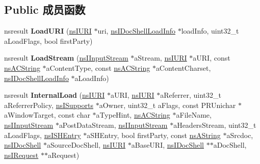 \subsection*{Public 成员函数}
\begin{DoxyCompactItemize}
\item 
\mbox{\label{interfacens_i_doc_shell_a72992d3fb915fd40d8b8e72e91249b92}} 
nsresult {\bfseries Load\+U\+RI} (\hyperlink{interfacens_i_u_r_i}{ns\+I\+U\+RI} $\ast$uri, \hyperlink{interfacens_i_doc_shell_load_info}{ns\+I\+Doc\+Shell\+Load\+Info} $\ast$load\+Info, uint32\+\_\+t a\+Load\+Flags, bool first\+Party)
\item 
\mbox{\label{interfacens_i_doc_shell_a13616578ed265801fd6cc0464797a67a}} 
nsresult {\bfseries Load\+Stream} (\hyperlink{interfacens_i_input_stream}{ns\+I\+Input\+Stream} $\ast$a\+Stream, \hyperlink{interfacens_i_u_r_i}{ns\+I\+U\+RI} $\ast$a\+U\+RI, const \hyperlink{structns_c_string_container}{ns\+A\+C\+String} $\ast$a\+Content\+Type, const \hyperlink{structns_c_string_container}{ns\+A\+C\+String} $\ast$a\+Content\+Charset, \hyperlink{interfacens_i_doc_shell_load_info}{ns\+I\+Doc\+Shell\+Load\+Info} $\ast$a\+Load\+Info)
\item 
\mbox{\label{interfacens_i_doc_shell_ab645058ca868a0bb4ae724ca9735cf42}} 
nsresult {\bfseries Internal\+Load} (\hyperlink{interfacens_i_u_r_i}{ns\+I\+U\+RI} $\ast$a\+U\+RI, \hyperlink{interfacens_i_u_r_i}{ns\+I\+U\+RI} $\ast$a\+Referrer, uint32\+\_\+t a\+Referrer\+Policy, \hyperlink{interfacens_i_supports}{ns\+I\+Supports} $\ast$a\+Owner, uint32\+\_\+t a\+Flags, const P\+R\+Unichar $\ast$a\+Window\+Target, const char $\ast$a\+Type\+Hint, \hyperlink{structns_c_string_container}{ns\+A\+C\+String} $\ast$a\+File\+Name, \hyperlink{interfacens_i_input_stream}{ns\+I\+Input\+Stream} $\ast$a\+Post\+Data\+Stream, \hyperlink{interfacens_i_input_stream}{ns\+I\+Input\+Stream} $\ast$a\+Headers\+Stream, uint32\+\_\+t a\+Load\+Flags, \hyperlink{interfacens_i_supports}{ns\+I\+S\+H\+Entry} $\ast$a\+S\+H\+Entry, bool first\+Party, const \hyperlink{structns_string_container}{ns\+A\+String} $\ast$a\+Srcdoc, \hyperlink{interfacens_i_doc_shell}{ns\+I\+Doc\+Shell} $\ast$a\+Source\+Doc\+Shell, \hyperlink{interfacens_i_u_r_i}{ns\+I\+U\+RI} $\ast$a\+Base\+U\+RI, \hyperlink{interfacens_i_doc_shell}{ns\+I\+Doc\+Shell} $\ast$$\ast$a\+Doc\+Shell, \hyperlink{interfacens_i_request}{ns\+I\+Request} $\ast$$\ast$a\+Request)

\end{DoxyCompactItemize}
